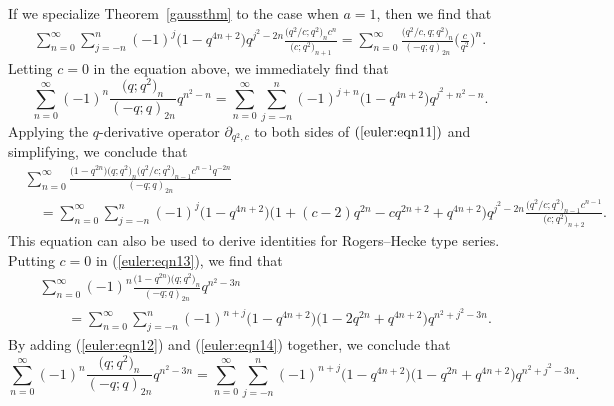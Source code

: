 \documentclass[10pt,a4paper]{amsart}
\numberwithin{equation}{section}
\begin{document}
 If we specialize Theorem~\ref{gaussthm} to the case when $a=1$, then we find that
 \begin{align}\label{euler:eqn11}
 	\sum_{n=0}^\infty \sum_{j=-n}^n (-1)^j \bigl(1-q^{4n+2}\bigr)	q^{j^2-2n}
 	\frac{\bigl(q^2/c; q^2\bigr)_n c^n}{\bigl(c; q^2\bigr)_{n+1}}
 	=\sum_{n=0}^\infty \frac{\bigl(q^2/c, q; q^2\bigr)_n}{(-q; q)_{2n}}\biggl(\frac{c}{q^2}\biggr)^n.
 \end{align}
Letting $c=0$ in the equation above, we immediately find that
\begin{equation}\label{euler:eqn12}
\sum_{n=0}^\infty (-1)^n \frac{\bigl(q; q^2\bigr)_n}{(-q; q)_{2n}} q^{n^2-n}
= \sum_{n=0}^\infty \sum_{j=-n}^n (-1)^{j+n} \bigl(1-q^{4n+2}\bigr)	q^{j^2+n^2-n}.
\end{equation}	
Applying the $q$-derivative operator $\partial_{q^2, c}$ to both sides of $(\ref{euler:eqn11})$ and simplifying, we conclude that
\begin{align}\label{euler:eqn13}
 &\sum_{n=0}^\infty \frac{\bigl(1-q^{2n}\bigr)\bigl(q; q^2\bigr)_n\bigl(q^2/c; q^2\bigr)_{n-1}c^{n-1}q^{-2n}}{(-q; q)_{2n}}\\
 &\quad{}=\sum_{n=0}^\infty \sum_{j=-n}^n (-1)^j \bigl(1-q^{4n+2}\bigr) \bigl(1+(c-2)q^{2n}-cq^{2n+2}+q^{4n+2}\bigr)	q^{j^2-2n}
 	\frac{\bigl(q^2/c; q^2\bigr)_{n-1} c^{n-1}}{\bigl(c; q^2\bigr)_{n+2}}. \nonumber
 \end{align}
This equation can also be used to derive identities for Rogers--Hecke type series. Putting $c=0$ in (\ref{euler:eqn13}), we find that
\begin{align}
&\sum_{n=0}^{\infty} (-1)^n \frac{\bigl(1-q^{2n}\bigr)\bigl(q; q^2\bigr)_n }{(-q; q)_{2n}} q^{n^2-3n}\nonumber\\
&\qquad{}=\sum_{n=0}^\infty \sum_{j=-n}^n (-1)^{n+j} \bigl(1-q^{4n+2}\bigr) \bigl(1-2q^{2n}+q^{4n+2}\bigr)	q^{n^2+j^2-3n}.\label{euler:eqn14}
\end{align}
By adding (\ref{euler:eqn12}) and (\ref{euler:eqn14}) together, we conclude that
\begin{equation*}%
\sum_{n=0}^{\infty} (-1)^n \frac{\bigl(q; q^2\bigr)_n }{(-q; q)_{2n}} q^{n^2-3n}
=\sum_{n=0}^\infty \sum_{j=-n}^n (-1)^{n+j} \bigl(1-q^{4n+2}\bigr) \bigl(1-q^{2n}+q^{4n+2}\bigr)	q^{n^2+j^2-3n}.
\end{equation*}
\end{document}

